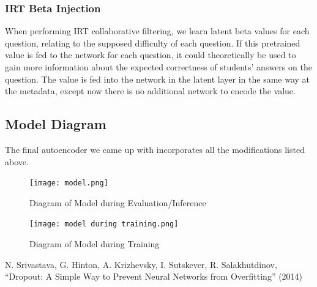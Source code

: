\documentclass{article}
\begin{document}
\subsubsection{IRT Beta Injection}
When performing IRT collaborative filtering, we learn latent beta values for each question, relating to the supposed difficulty of each question. If this pretrained value is fed to the network for each question, it could theoretically be used to gain more information about the expected correctness of students' answers on the question. The value is fed into the network in the latent layer in the same way at the metadata, except now there is no additional network to encode the value.
\subsection{Model Diagram}
The final autoencoder we came up with incorporates all the modifications listed above.
\begin{figure}[H]
\centering
\texttt{[image: model.png]}
\caption{Diagram of Model during Evaluation/Inference}
\label{fig:enter-label}
\end{figure}

\begin{figure}[H]
    \texttt{[image: model during training.png]}
    \caption{Diagram of Model during Training}
    \label{fig:enter-label}
\end{figure}
\newpage

N. Srivastava, G. Hinton, A. Krizhevsky, I. Sutskever, R. Salakhutdinov, “Dropout: A Simple Way to Prevent Neural Networks from Overfitting” (2014)
\end{document}
